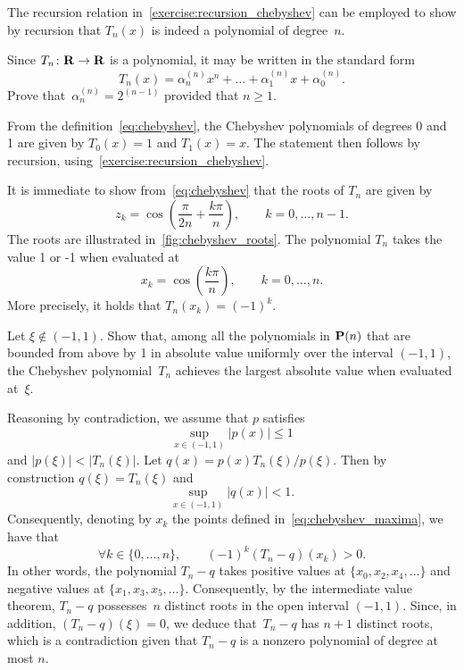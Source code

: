 \begin{remark}
    The recursion relation in~\cref{exercise:recursion_chebyshev}
    can be employed to show by recursion that $T_n(x)$ is indeed a polynomial of degree~$n$.
\end{remark}

\begin{exercise}
    \label{exercise:chebyshev_leading_coefficient}
    Since $T_n\colon \mathbf R \to \mathbf R$ is a polynomial,
    it may be written in the standard form
    \[
        T_n(x) = \alpha^{(n)}_n x^n + \dotsc + \alpha^{(n)}_1 x + \alpha^{(n)}_0.
    \]
    Prove that~$\alpha^{(n)}_n = 2^{(n-1)}$ provided that $n \geq 1$.
\end{exercise}
\begin{solution}
    From the definition~\eqref{eq:chebyshev},
    the Chebyshev polynomials of degrees 0 and 1 are given by $T_0(x) = 1$ and $T_1(x) = x$.
    The statement then follows by recursion, using~\cref{exercise:recursion_chebyshev}.
\end{solution}

It is immediate to show from~\eqref{eq:chebyshev} that the roots of $T_n$ are given by
\[
    z_k = \cos \left( \frac{\pi}{2n} + \frac{k\pi}{n} \right), \qquad k = 0, \dotsc, n-1.
\]
The roots are illustrated in~\cref{fig:chebyshev_roots}.
The polynomial $T_n$ takes the value 1 or -1 when evaluated at
\begin{equation}
    \label{eq:chebyshev_maxima}
    x_k = \cos \left( \frac{k \pi}{n} \right), \qquad k = 0, \dotsc, n.
\end{equation}
More precisely, it holds that $T_n(x_k) = (-1)^k$.

\begin{exercise}
    Let $\xi \notin (-1, 1)$.
    Show that, among all the polynomials in $\mathbf P(n)$ that are bounded from above by 1 in absolute value uniformly over the interval $(-1, 1)$,
    the Chebyshev polynomial~$T_n$ achieves the largest absolute value when evaluated at~$\xi$.
\end{exercise}
\begin{solution}
    Reasoning by contradiction,
    we assume that $p$ satisfies
    \[
        \sup_{x \in (-1, 1)} \lvert p(x) \rvert \leq 1
    \]
    and $\lvert p(\xi) \rvert < \lvert T_n(\xi) \rvert$.
    Let $q(x) = p(x) T_n(\xi) / p(\xi)$.
    Then by construction $q(\xi) = T_n(\xi)$
    and
    \[
       \sup_{x \in (-1, 1)} \lvert q(x) \rvert < 1.
    \]
    Consequently, denoting by $x_k$ the points defined in~\eqref{eq:chebyshev_maxima},
    we have that
    \[
        \forall k \in \{0, \dotsc, n\}, \qquad
        (-1)^k (T_n - q)(x_k) > 0.
    \]
    In other words, the polynomial $T_n - q$ takes positive values at $\{x_0, x_2, x_4, \dotsc\}$ and negative values at $\{x_1, x_3, x_5, \dotsc\}$.
    Consequently, by the intermediate value theorem,
    $T_n - q$ possesses~$n$ distinct roots in the open interval $(-1, 1)$.
    Since, in addition, $(T_n - q)(\xi) = 0$,
    we deduce that~$T_n - q$ has $n+1$ distinct roots,
    which is a contradiction given that $T_n - q$ is a nonzero polynomial of degree at most $n$.
\end{solution}


